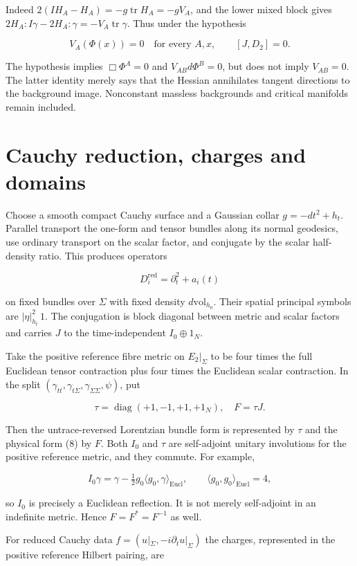 Indeed $2(IH_A-H_A)=-g\operatorname{tr}H_A=-gV_A$, and the lower mixed block gives $2H_A:I\gamma-2H_A:\gamma=-V_A\operatorname{tr}\gamma$. Thus under the hypothesis

\[
 V_A(\Phi(x))=0\quad\text{for every }A,x,
 \qquad [J,D_2]=0.
 \tag{17}
\]

The hypothesis implies $\Box\Phi^A=0$ and $V_{AB}d\Phi^B=0$, but does not imply $V_{AB}=0$. The latter identity merely says that the Hessian annihilates tangent directions to the background image. Nonconstant massless backgrounds and critical manifolds remain included.

\section{Cauchy reduction, charges and domains}

Choose a smooth compact Cauchy surface and a Gaussian collar $g=-dt^2+h_t$. Parallel transport the one-form and tensor bundles along its normal geodesics, use ordinary transport on the scalar factor, and conjugate by the scalar half-density ratio. This produces operators

\[
 D_i^{\mathrm{red}}=\partial_t^2+a_i(t)
\]

on fixed bundles over $\Sigma$ with fixed density $d\mathrm{vol}_{h_0}$. Their spatial principal symbols are $|\eta|_{h_t}^2\,1$. The conjugation is block diagonal between metric and scalar factors and carries $J$ to the time-independent $I_0\oplus1_N$.

Take the positive reference fibre metric on $E_2|_\Sigma$ to be four times the full Euclidean tensor contraction plus four times the Euclidean scalar contraction. In the split $(\gamma_{tt},\gamma_{t\Sigma},\gamma_{\Sigma\Sigma},\psi)$, put

\[
 \tau=\operatorname{diag}(+1,-1,+1,+1_N),\quad F=\tau J.
 \tag{18}
\]

Then the untrace-reversed Lorentzian bundle form is represented by $\tau$ and the physical form (8) by $F$. Both $I_0$ and $\tau$ are self-adjoint unitary involutions for the positive reference metric, and they commute. For example,

\[
 I_0\gamma=\gamma-\tfrac12g_0\langle g_0,\gamma\rangle_{\mathrm{Eucl}},
 \qquad \langle g_0,g_0\rangle_{\mathrm{Eucl}}=4,
\]

so $I_0$ is precisely a Euclidean reflection. It is not merely self-adjoint in an indefinite metric. Hence $F=F^*=F^{-1}$ as well.

For reduced Cauchy data $f=(u|_\Sigma,-i\partial_tu|_\Sigma)$ the charges, represented in the positive reference Hilbert pairing, are

